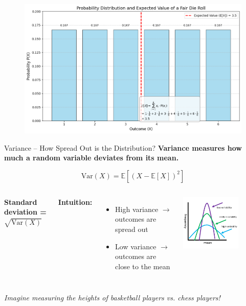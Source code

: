 \documentclass[handout,aspectratio=169]{beamer}
\begin{document}
\begin{frame}[plain]
	\begin{figure}[htbp]
		\centering
		\includegraphics[width=\textwidth]{figs/expectation.png}
	\end{figure}
\end{frame}

\begin{frame}{Variance – How Spread Out is the Distribution?}
  \textbf{Variance measures how much a random variable deviates from its mean.}

  \vspace{1em}
  \[
    \text{Var}(X) = \mathbb{E}[(X - \mathbb{E}[X])^2]
  \]
  \begin{columns}
\textbf{Standard deviation = } $\sqrt{\text{Var}(X)}$

  \vspace{1em}
  \textbf{Intuition:}
  \begin{itemize}
    \item High variance $\rightarrow$ outcomes are spread out
    \item Low variance $\rightarrow$ outcomes are close to the mean
  \end{itemize}
    \includegraphics[width=0.7\textwidth]{figs/variance.png}
\end{columns}

  

  \vspace{1em}
  \textit{Imagine measuring the heights of basketball players vs. chess players!}
\end{frame}
\end{document}
